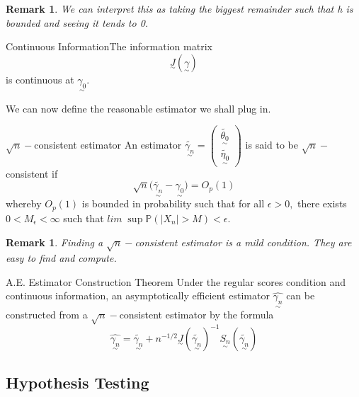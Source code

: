 \documentclass[twoside]{article}
\newtheorem{remark}[theorem]{Remark}
\newcommand{\prob}{\mathbb{P}}
\newcommand{\utilde}{\underset{\sim}}
\begin{document}
\begin{remark} We can interpret this as taking the biggest remainder such that h is bounded and seeing it tends to 0.
\end{remark}

\begin{proposition_exam}{Continuous Information}{}The information matrix 
$$
\utilde{J}(\utilde{\gamma})
$$
is continuous at $\utilde{\gamma_{0}}.$
\end{proposition_exam}

We can now define the reasonable estimator we shall plug in.
\begin{definition_exam}{$\sqrt{n}-$consistent estimator}{}
An estimator $\tilde{\utilde{\gamma_{n}}} = \begin{pmatrix} \tilde{\utilde{\theta_{0}}} \\\tilde{\utilde{\eta_{0}}} \end{pmatrix}$ is said to be $\sqrt{n}-$consistent if 
\begin{equation}
  \sqrt{n}\big(\tilde{\utilde{\gamma_{n}}} - \utilde{\gamma_{0}} \big) = O_p(1)
\end{equation}
whereby $O_p(1)$ is bounded in probability such that for all $\epsilon > 0,$ there exists $0 < M_{\epsilon} < \infty$ such that $lim\;\sup \prob(|X_n| > M) < \epsilon.$
\end{definition_exam}

\begin{remark}
Finding a $\sqrt{n}-$consistent estimator is a mild condition. They are easy to find and compute.
\end{remark}

\begin{theorem_exam}{A.E. Estimator Construction Theorem}{} Under the regular scores condition and continuous information, an asymptotically efficient estimator $\hat{\utilde{\gamma_{n}}}$ can be constructed from a $\sqrt{n}-$consistent estimator by the formula 
\begin{equation}
  \hat{\utilde{\gamma_{n}}} = \tilde{\utilde{\gamma_{n}}} + n^{-1/2}\utilde{J}(\tilde{\utilde{\gamma_{n}}})^{-1}\utilde{S_{n}}(\tilde{\utilde{\gamma_{n}}})
\end{equation}
\end{theorem_exam}

\subsection{Hypothesis Testing}
\end{document}
